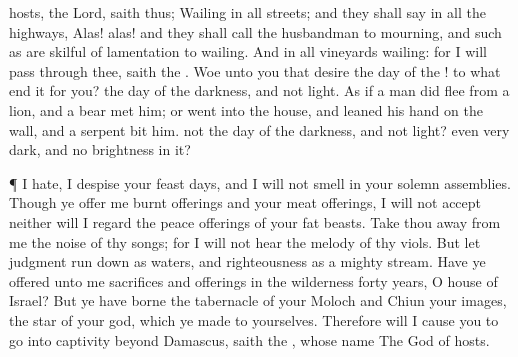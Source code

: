 {hosts, the
Lord,
saith thus;
Wailing
{} in all
streets; and they shall
say in all the
highways,
Alas!
alas! and they shall
call the
husbandman to
mourning, and such as are
skilful of
lamentation to
wailing.
And in all
vineyards
{}
wailing: for I will
pass
through thee,
saith the
{}.
Woe unto you that
desire the
day of the
{}! to what
end
{} it for you? the
day of the
{}
{}
darkness, and not
light.
As if a
man did
flee
from a
lion, and a
bear
met him; or
went into the
house, and
leaned his
hand on the
wall, and a
serpent
bit him.
 not the
day of the
{}
{}
darkness, and not
light? even very
dark, and no
brightness in it?
\par }{\PP {}¶ I
hate, I
despise your feast
days, and I will not
smell in your solemn
assemblies.
Though ye
offer me burnt
offerings and your meat
offerings, I will not
accept
{} neither will I
regard the peace
offerings of your fat
beasts.
Take thou
away from me the
noise of thy
songs; for I will not
hear the
melody of thy
viols.
But let
judgment run
down as
waters, and
righteousness as a
mighty
stream.
Have ye
offered unto me
sacrifices and
offerings in the
wilderness
forty
years, O
house of
Israel?
But ye have
borne the
tabernacle of your
Moloch and
Chiun your
images, the
star of your
god, which ye
made to yourselves.
Therefore will I cause you to go into
captivity
beyond
Damascus,
saith the
{}, whose
name
{} The
God of
hosts.

}
